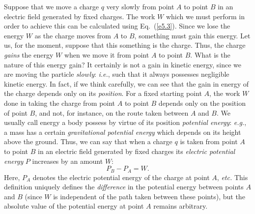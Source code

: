 Suppose that we move a charge $q$ very slowly from point $A$ to point $B$
in an electric field generated by fixed charges. The work $W$ which we must perform in order to
achieve this  can be calculated
using Eq.~(\ref{e5.3}). Since we lose the energy $W$ as the charge moves from $A$ to
$B$, something must gain this energy. Let us, for the moment, suppose that this
something is the charge. Thus, the charge {\em gains}\/ the energy $W$ when
we move it from point $A$ to point $B$. What is the nature of this energy gain?
It certainly is not a gain in kinetic energy, since we are moving the particle
 {\em slowly}:
{\em i.e.}, such that it always possesses negligible kinetic energy. 
In fact, if we think carefully, we can see that the gain in energy of the
charge depends only on its {\em position}. For a fixed starting point $A$, the work $W$ 
done in taking the charge from point $A$ to point $B$ depends only on the
position of point $B$, and not, for instance, on the route taken between
$A$ and $B$. We usually call energy a body possess by virtue of its position 
{\em potential energy}: {\em e.g.}, a mass has a certain {\em gravitational potential energy}
which depends on its height above the ground. Thus, we can say that when
a charge $q$ is taken from point $A$ to point $B$ in an electric field generated by fixed charges its
{\em electric potential energy}\/ $P$ increases by an amount $W$:
\begin{equation}\label{e5.4}
P_B - P_A = W.
\end{equation}
Here, $P_A$ denotes the electric  potential energy of the charge at point $A$,
{\em etc.} This definition uniquely defines the {\em difference} in the potential energy
between points $A$ and  $B$ (since $W$ is independent of the path taken
between these points), but the absolute value of the potential energy
at point $A$ remains arbitrary.

